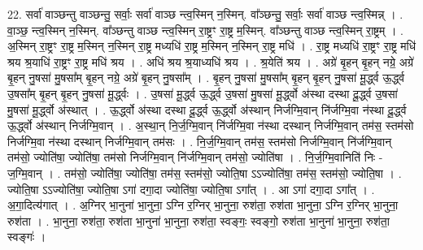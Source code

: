 \documentclass[17pt]{extarticle}
\begin{document}
22. सर्वा॑ वाञ्छन्तु वाञ्छन्तु॒ सर्वाः॒ सर्वा॑ वाञ्छ न्त्व॒स्मिन् न॒स्मिन्. वा᳚ञ्छन्तु॒ सर्वाः॒ सर्वा॑ वाञ्छ न्त्व॒स्मिन्न् । . वा॒ञ्छ॒ न्त्व॒स्मिन् न॒स्मिन्. वा᳚ञ्छन्तु वाञ्छ न्त्व॒स्मिन् रा॒ष्ट्रꣳ रा॒ष्ट्र म॒स्मिन्. वा᳚ञ्छन्तु वाञ्छ न्त्व॒स्मिन् रा॒ष्ट्रम् । . अ॒स्मिन् रा॒ष्ट्रꣳ रा॒ष्ट्र म॒स्मिन् न॒स्मिन् रा॒ष्ट्र मध्यधि॑ रा॒ष्ट्र म॒स्मिन् न॒स्मिन् रा॒ष्ट्र मधि॑ । . रा॒ष्ट्र मध्यधि॑ रा॒ष्ट्रꣳ रा॒ष्ट्र मधि॑ श्रय श्र॒याधि॑ रा॒ष्ट्रꣳ रा॒ष्ट्र मधि॑ श्रय । . अधि॑ श्रय श्र॒याध्यधि॑ श्रय । . श्र॒येति॑ श्रय । . अग्रे॑ बृ॒हन् बृ॒हन् नग्रे॒ अग्रे॑ बृ॒हन् नु॒षसा॑ मु॒षसा᳚म् बृ॒हन् नग्रे॒ अग्रे॑ बृ॒हन् नु॒षसा᳚म् । . बृ॒हन् नु॒षसा॑ मु॒षसा᳚म् बृ॒हन् बृ॒हन् नु॒षसा॑ मू॒र्द्ध्व ऊ॒र्द्ध्व उ॒षसा᳚म् बृ॒हन् बृ॒हन् नु॒षसा॑ मू॒र्द्ध्वः । . उ॒षसा॑ मू॒र्द्ध्व ऊ॒र्द्ध्व उ॒षसा॑ मु॒षसा॑ मू॒र्द्ध्वो अ॑स्था दस्था दू॒र्द्ध्व उ॒षसा॑ मु॒षसा॑ मू॒र्द्ध्वो अ॑स्थात् । . ऊ॒र्द्ध्वो अ॑स्था दस्था दू॒र्द्ध्व ऊ॒र्द्ध्वो अ॑स्थान् निर्जग्मि॒वान् नि॑र्जग्मि॒वा न॑स्था दू॒र्द्ध्व ऊ॒र्द्ध्वो अ॑स्थान् निर्जग्मि॒वान् । . अ॒स्था॒न् नि॒र्ज॒ग्मि॒वान् नि॑र्जग्मि॒वा न॑स्था दस्थान् निर्जग्मि॒वान् तम॑स॒ स्तम॑सो निर्जग्मि॒वा न॑स्था दस्थान् निर्जग्मि॒वान् तम॑सः । . नि॒र्ज॒ग्मि॒वान् तम॑स॒ स्तम॑सो निर्जग्मि॒वान् नि॑र्जग्मि॒वान् तम॑सो॒ ज्योति॑षा॒ ज्योति॑षा॒ तम॑सो निर्जग्मि॒वान् नि॑र्जग्मि॒वान् तम॑सो॒ ज्योति॑षा । . नि॒र्ज॒ग्मि॒वानिति॑ निः - ज॒ग्मि॒वान् । . तम॑सो॒ ज्योति॑षा॒ ज्योति॑षा॒ तम॑स॒ स्तम॑सो॒ ज्योति॒षा ऽऽज्योति॑षा॒ तम॑स॒ स्तम॑सो॒ ज्योति॒षा । . ज्योति॒षा ऽऽज्योति॑षा॒ ज्योति॒षा ऽगा॑ दगा॒दा ज्योति॑षा॒ ज्योति॒षा ऽगा᳚त् । . आ ऽगा॑ दगा॒दा ऽगा᳚त् । . अ॒गा॒दित्य॑गात् । . अ॒ग्निर् भा॒नुना॑ भा॒नुना॒ ऽग्नि र॒ग्निर् भा॒नुना॒ रुश॑ता॒ रुश॑ता भा॒नुना॒ ऽग्नि र॒ग्निर् भा॒नुना॒ रुश॑ता । . भा॒नुना॒ रुश॑ता॒ रुश॑ता भा॒नुना॑ भा॒नुना॒ रुश॑ता॒ स्वङ्गः॒ स्वङ्गो॒ रुश॑ता भा॒नुना॑ भा॒नुना॒ रुश॑ता॒ स्वङ्गः॑ । \newline
\end{document}
